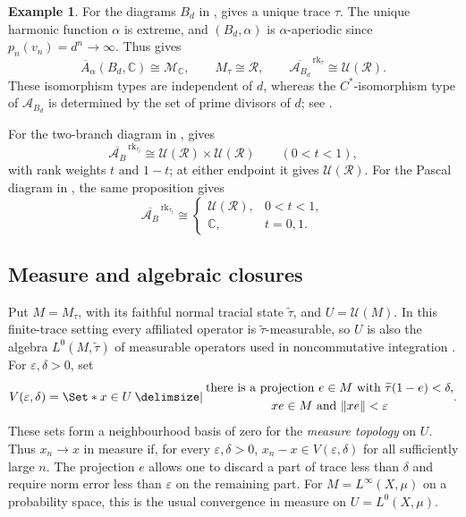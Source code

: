 \documentclass[11pt]{amsart}
\providecommand\given{}
\newcommand\SetSymbol[1][]{%
  \nonscript\:#1\vert\allowbreak\nonscript\:\mathopen{}%
}
\renewcommand\given{\SetSymbol[\delimsize]}#1%
\DeclareMathOperator{\rk}{rk}
\theoremstyle{definition}
\newtheorem{example}[theorem]{Example}
\theoremstyle{remark}
\begin{document}
\begin{example}\label{ex:uhf-completions}
For the diagrams $B_d$ in ,
 gives a unique trace $\tau$.
The unique harmonic function $\alpha$ is extreme, and
$(B_d,\alpha)$ is $\alpha$-aperiodic since $p_n(v_n)=d^n\to\infty$.  Thus
 gives
\[
 \overline A_\alpha(B_d,\mathbb C)\cong\mathcal M_{\mathbb C},\qquad
 M_\tau\cong\mathcal R,\qquad
 \overline{\mathcal A_{B_d}}^{\,\rk_\tau}\cong\mathcal U(\mathcal R).
\]
These isomorphism types are independent of $d$, whereas the
$C^*$-isomorphism type of $\mathcal A_{B_d}$ is determined by the
set of prime divisors of $d$; see .
\end{example}

For the two-branch diagram in ,
 gives
\[
 \overline{\mathcal A_B}^{\,\rk_{\tau_t}}
 \cong\mathcal U(\mathcal R)\times\mathcal U(\mathcal R)
 \qquad(0<t<1),
\]
with rank weights $t$ and $1-t$; at either endpoint it gives
$\mathcal U(\mathcal R)$.
For the Pascal diagram in , the same proposition gives
\[
 \overline{\mathcal A_B}^{\,\rk_{\tau_t}}
 \cong
 \begin{cases}
  \mathcal U(\mathcal R),&0<t<1,\\
  \mathbb C,&t=0,1.
 \end{cases}
\]

\subsection{Measure and algebraic closures}
\label{subsec:other-closures}

Put $M=M_\tau$, with its faithful normal tracial state
$\widetilde\tau$, and $U=\mathcal U(M)$.
In this finite-trace setting every affiliated operator is
$\widetilde\tau$-measurable, so $U$ is also the algebra
$L^0(M,\widetilde\tau)$ of measurable operators used in
noncommutative integration \cite{Nelson1974,Nayak2019}.
For $\varepsilon,\delta>0$, set
\[
 V(\varepsilon,\delta)=
 \Set*{x\in U\given
 \begin{gathered}
 \text{there is a projection }e\in M\text{ with }
 \widetilde\tau(1-e)<\delta,\\
 xe\in M\text{ and }\|xe\|<\varepsilon
 \end{gathered}}.
\]
These sets form a neighbourhood basis of zero for the
\emph{measure topology} on $U$.
Thus $x_n\to x$ in measure if, for every $\varepsilon,\delta>0$,
$x_n-x\in V(\varepsilon,\delta)$ for all sufficiently large $n$.
The projection $e$ allows one to discard a part of trace less than
$\delta$ and require norm error less than $\varepsilon$ on the
remaining part.  For $M=L^\infty(X,\mu)$ on a probability space,
this is the usual convergence in measure on $U=L^0(X,\mu)$.
\end{document}
